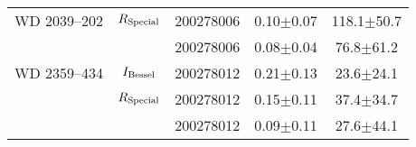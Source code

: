 \begin{table}
\begin{tabular}{lclcc}
        WD 2039--202 & $R_{\rm Special}$ & 200278006 & \phantom{0}0.10$\pm$0.07 &          118.1$\pm$50.7 \\
                     &                   & 200278006 & \phantom{0}0.08$\pm$0.04 & \phantom{0}76.8$\pm$61.2 \\
        WD 2359--434 & $I_{\rm Bessel}$  & 200278012 & \phantom{0}0.21$\pm$0.13 & \phantom{0}23.6$\pm$24.1 \\
                     & $R_{\rm Special}$ & 200278012 & \phantom{0}0.15$\pm$0.11 & \phantom{0}37.4$\pm$34.7 \\
                     &                   & 200278012 & \phantom{0}0.09$\pm$0.11 & \phantom{0}27.6$\pm$44.1 \\
        \hline
    \end{tabular}
\end{table}        
